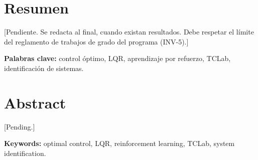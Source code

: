 \chapter*{Resumen}

[Pendiente. Se redacta al final, cuando existan resultados. Debe respetar el límite del
reglamento de trabajos de grado del programa (INV-5).]

\vspace{1em}
\noindent\textbf{Palabras clave:} control óptimo, LQR, aprendizaje por refuerzo, TCLab,
identificación de sistemas.

\chapter*{Abstract}

[Pending.]

\vspace{1em}
\noindent\textbf{Keywords:} optimal control, LQR, reinforcement learning, TCLab,
system identification.
